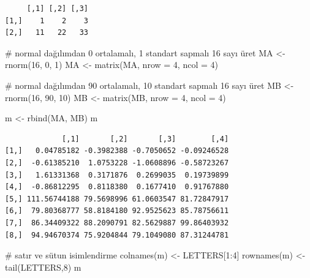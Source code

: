 \documentclass[
  letterpaper,
  DIV=11,
  numbers=noendperiod]{scrreprt}
\newenvironment{Shaded}{\begin{snugshade}}{\end{snugshade}}
\newcommand{\AttributeTok}[1]{\textcolor[rgb]{0.40,0.45,0.13}{#1}}
\newcommand{\CommentTok}[1]{\textcolor[rgb]{0.37,0.37,0.37}{#1}}
\newcommand{\DecValTok}[1]{\textcolor[rgb]{0.68,0.00,0.00}{#1}}
\newcommand{\FunctionTok}[1]{\textcolor[rgb]{0.28,0.35,0.67}{#1}}
\newcommand{\NormalTok}[1]{\textcolor[rgb]{0.00,0.23,0.31}{#1}}
\newcommand{\OtherTok}[1]{\textcolor[rgb]{0.00,0.23,0.31}{#1}}
\newcommand{\SpecialCharTok}[1]{\textcolor[rgb]{0.37,0.37,0.37}{#1}}
\begin{document}
\begin{verbatim}
     [,1] [,2] [,3]
[1,]    1    2    3
[2,]   11   22   33
\end{verbatim}

\begin{Shaded}
\begin{Highlighting}[]
\CommentTok{\# normal dağılımdan 0 ortalamalı, 1 standart sapmalı 16 sayı üret}
\NormalTok{MA }\OtherTok{\textless{}{-}} \FunctionTok{rnorm}\NormalTok{(}\DecValTok{16}\NormalTok{, }\DecValTok{0}\NormalTok{, }\DecValTok{1}\NormalTok{)}
\NormalTok{MA }\OtherTok{\textless{}{-}} \FunctionTok{matrix}\NormalTok{(MA, }\AttributeTok{nrow =} \DecValTok{4}\NormalTok{, }\AttributeTok{ncol =} \DecValTok{4}\NormalTok{)}

\CommentTok{\# normal dağılımdan 90 ortalamalı, 10 standart sapmalı 16 sayı üret}
\NormalTok{MB }\OtherTok{\textless{}{-}} \FunctionTok{rnorm}\NormalTok{(}\DecValTok{16}\NormalTok{, }\DecValTok{90}\NormalTok{, }\DecValTok{10}\NormalTok{)}
\NormalTok{MB }\OtherTok{\textless{}{-}} \FunctionTok{matrix}\NormalTok{(MB, }\AttributeTok{nrow =} \DecValTok{4}\NormalTok{, }\AttributeTok{ncol =} \DecValTok{4}\NormalTok{)}

\NormalTok{m }\OtherTok{\textless{}{-}} \FunctionTok{rbind}\NormalTok{(MA, MB)}
\NormalTok{m}
\end{Highlighting}
\end{Shaded}

\begin{verbatim}
             [,1]       [,2]       [,3]        [,4]
[1,]   0.04785182 -0.3982388 -0.7050652 -0.09246528
[2,]  -0.61385210  1.0753228 -1.0608896 -0.58723267
[3,]   1.61331368  0.3171876  0.2699035  0.19739899
[4,]  -0.86812295  0.8118380  0.1677410  0.91767880
[5,] 111.56744188 79.5698996 61.0603547 81.72847917
[6,]  79.80368777 58.8184180 92.9525623 85.78756611
[7,]  86.34409322 88.2090791 82.5629887 99.86403932
[8,]  94.94670374 75.9204844 79.1049080 87.31244781
\end{verbatim}

\begin{Shaded}
\begin{Highlighting}[]
\CommentTok{\# satır ve sütun isimlendirme}
\FunctionTok{colnames}\NormalTok{(m) }\OtherTok{\textless{}{-}}\NormalTok{ LETTERS[}\DecValTok{1}\SpecialCharTok{:}\DecValTok{4}\NormalTok{]}
\FunctionTok{rownames}\NormalTok{(m) }\OtherTok{\textless{}{-}} \FunctionTok{tail}\NormalTok{(LETTERS,}\DecValTok{8}\NormalTok{)}
\NormalTok{m}
\end{Highlighting}
\end{Shaded}
\end{document}
